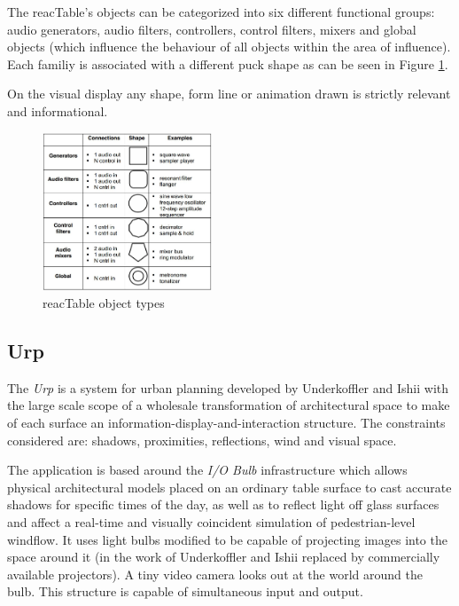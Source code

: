 The reacTable's objects can be categorized into six different functional groups: audio generators, audio filters, controllers, control filters, mixers and global objects (which influence the behaviour of all objects within the area of influence). Each familiy is associated with a different puck shape as can be seen in Figure \ref{fig:reactable3}.

On the visual display any shape, form line or animation drawn is strictly relevant and informational. 

\begin{figure}
\centering
\includegraphics[width=0.45\textwidth]{figures/reactable-shapes.jpg}
\caption{reacTable object types}
\label{fig:reactable3}
\end{figure}


\subsection{Urp}

The \textit{Urp} is a system for urban planning developed by Underkoffler and Ishii \cite{underkoffler99} with the large scale scope of a wholesale transformation of architectural space to make of each surface an information-display-and-interaction structure. 
The constraints considered are: shadows, proximities, reflections, wind and visual space. 

The application is based around the \textit{I/O Bulb} infrastructure which allows physical architectural models placed on an ordinary table surface to cast accurate shadows for specific times of the day, as well as to reflect light off glass surfaces and affect a real-time and visually coincident simulation of pedestrian-level windflow. 
It uses light bulbs modified to be capable of projecting images into the space around it (in the work of Underkoffler and Ishii replaced by commercially available projectors). A tiny video camera looks out at the world around the bulb. 
This structure is capable of simultaneous input and output. 

